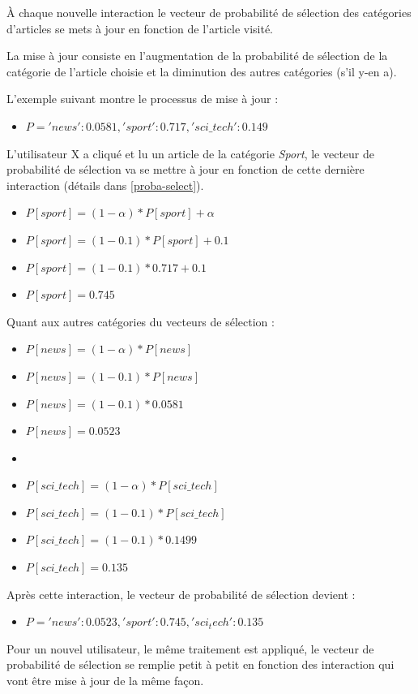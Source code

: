         À chaque nouvelle interaction le vecteur de probabilité de sélection des catégories d'articles se mets à jour en fonction de l'article visité. 

        La mise à jour consiste en l'augmentation de la probabilité de sélection de la catégorie de l'article choisie et la diminution des autres catégories (s'il y-en a). 

        L'exemple suivant montre le processus de mise à jour :
        \begin{itemize}[label={}]
            \item $P = {'news': 0.0581,'sport': 0.717, 'sci\_tech': 0.149}$\\
        \end{itemize}

        L'utilisateur X a cliqué et lu un article de la catégorie \emph{Sport}, le vecteur de probabilité de sélection va se mettre à jour en fonction de cette dernière interaction (détails dans \ref{proba-select}).
        \begin{itemize}[label={}]
            \item $P[sport] = (1-{\alpha}) * {P[sport]} + {\alpha}$
            \item $P[sport] = (1-{0.1}) * {P[sport]} + {0.1}$
            \item $P[sport] = (1-{0.1}) * {0.717} + {0.1}$
            \item $P[sport] = 0.745$
        \end{itemize}

        Quant aux autres catégories du vecteurs de sélection :
        \begin{itemize}[label={}]
            \item $P[news] = (1-{\alpha}) * {P[news]} $
            \item $P[news] = (1-{0.1}) * {P[news]} $
            \item $P[news] = (1-{0.1}) * {0.0581} $
            \item $P[news] = 0.0523$
            \item 
            \item $P[sci\_tech] = (1-{\alpha}) * {P[sci\_tech]} $
            \item $P[sci\_tech] = (1-{0.1}) * {P[sci\_tech]} $
            \item $P[sci\_tech] = (1-{0.1}) * {0.1499} $
            \item $P[sci\_tech] = 0.135$
        \end{itemize}
        Après cette interaction, le vecteur de probabilité de sélection devient :
        \begin{itemize}[label={}]
            \item $P = {'news': 0.0523, 'sport': 0.745, 'sci_tech': 0.135}$\\
        \end{itemize}
        Pour un nouvel utilisateur, le même traitement est appliqué, le vecteur de probabilité de sélection se remplie petit à petit en fonction des interaction qui vont être mise à jour de la même façon.

